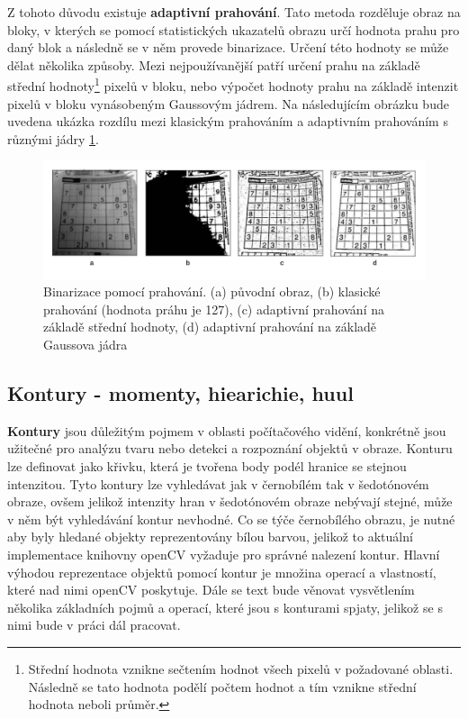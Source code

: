 Z tohoto důvodu existuje \textbf{adaptivní prahování}. Tato metoda rozděluje obraz na bloky, v kterých se pomocí statistických ukazatelů obrazu určí hodnota prahu pro daný blok a následně se v něm provede binarizace. Určení této hodnoty se může dělat několika způsoby. Mezi nejpoužívanější patří určení prahu na základě střední hodnoty\footnote{Střední hodnota vznikne sečtením hodnot všech pixelů v požadované oblasti. Následně se tato hodnota podělí počtem hodnot a tím vznikne střední hodnota neboli průměr.} pixelů v bloku, nebo výpočet hodnoty prahu na základě intenzit pixelů v bloku vynásobeným Gaussovým jádrem. Na následujícím obrázku bude uvedena ukázka rozdílu mezi klasickým prahováním a adaptivním prahováním s různými jádry \ref{prahovani}.

\newpage
\begin{figure}[h]
	\centering
	\includegraphics[width=1\textwidth]{obrazky/prahovani.png}
	\caption{Binarizace pomocí prahování. (a) původní obraz, (b) klasické prahování (hodnota práhu je 127), (c) adaptivní prahování na základě střední hodnoty, (d) adaptivní prahování na základě Gaussova jádra \cite{opencv_doc}}
	\label{prahovani}
\end{figure}


\subsection{Kontury - momenty, hiearichie, huul}
\label{kontury_chapter}
\textbf{Kontury} jsou důležitým pojmem v oblasti počítačového vidění, konkrétně jsou užitečné pro analýzu tvaru nebo detekci a rozpoznání objektů v obraze. Konturu lze definovat jako křivku, která je tvořena body podél hranice se stejnou intenzitou. Tyto kontury lze vyhledávat jak v černobílém tak v šedotónovém obraze, ovšem jelikož intenzity hran v šedotónovém obraze nebývají stejné, může v něm být vyhledávání kontur nevhodné. Co se týče černobílého obrazu, je nutné aby byly hledané objekty reprezentovány bílou barvou, jelikož to aktuální implementace knihovny openCV vyžaduje pro správné nalezení kontur. Hlavní výhodou reprezentace objektů pomocí kontur je množina operací a vlastností, které nad nimi openCV poskytuje. Dále se text bude věnovat vysvětlením několika základních pojmů a operací, které jsou s konturami spjaty, jelikož se s nimi bude v práci dál pracovat.   


